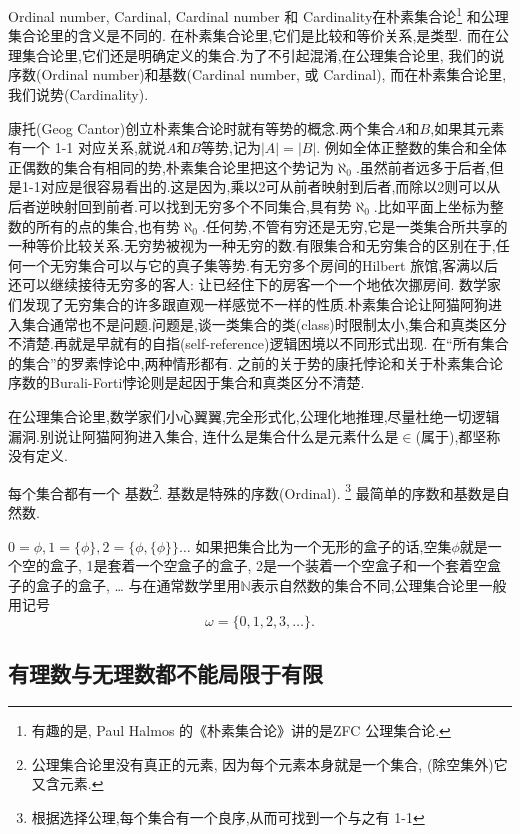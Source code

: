 \documentclass[main.tex]{subfiles}
\begin{document}
Ordinal number, Cardinal, Cardinal number 和 Cardinality在朴素集合论\footnote{有趣的是, Paul Halmos 的《朴素集合论》\cite{HalmosP}讲的是ZFC 公理集合论.}
和公理集合论里的含义是不同的. 
在朴素集合论里,它们是比较和等价关系,是类型.
而在公理集合论里,它们还是明确定义的集合.为了不引起混淆,在公理集合论里,
我们的说序数(Ordinal number)和基数(Cardinal number, 或 Cardinal),
而在朴素集合论里,我们说势(Cardinality).

康托(Geog Cantor)创立朴素集合论时就有等势的概念.两个集合$A$和$B$,如果其元素有一个 1-1 对应关系,就说$A$和$B$等势,记为$|A|=|B|$.
例如全体正整数的集合和全体正偶数的集合有相同的势,朴素集合论里把这个势记为$\aleph_0$.虽然前者远多于后者,但是1-1对应是很容易看出的.这是因为,乘以2可从前者映射到后者,而除以2则可以从后者逆映射回到前者.可以找到无穷多个不同集合,具有势$\aleph_0$.比如平面上坐标为整数的所有的点的集合,也有势$\aleph_0$.任何势,不管有穷还是无穷,它是一类集合所共享的一种等价比较关系.无穷势被视为一种无穷的数.有限集合和无穷集合的区别在于,任何一个无穷集合可以与它的真子集等势.有无穷多个房间的Hilbert 旅馆,客满以后还可以继续接待无穷多的客人: 让已经住下的房客一个一个地依次挪房间.
数学家们发现了无穷集合的许多跟直观一样感觉不一样的性质.朴素集合论让阿猫阿狗进入集合通常也不是问题.问题是,谈一类集合的类(class)时限制太小,集合和真类区分不清楚.再就是早就有的自指(self-reference)逻辑困境以不同形式出现.
在“所有集合的集合”的罗素悖论中,两种情形都有.
之前的关于势的康托悖论和关于朴素集合论序数的Burali-Forti悖论则是起因于集合和真类区分不清楚.

在公理集合论里,数学家们小心翼翼,完全形式化,公理化地推理,尽量杜绝一切逻辑漏洞.别说让阿猫阿狗进入集合, 连什么是集合什么是元素什么是$\in$(属于),都坚称没有定义.

每个集合都有一个
基数\footnote{公理集合论里没有真正的元素,
	因为每个元素本身就是一个集合, (除空集外)它又含元素.}. 
基数是特殊的序数(Ordinal).
\footnote{根据选择公理,每个集合有一个良序,从而可找到一个与之有 1-1 }
最简单的序数和基数是自然数.

$0 = \phi, 1 = \{\phi\}, 2 = \{\phi, \{\phi\}\}\dots$
如果把集合比为一个无形的盒子的话,空集$\phi$就是一个空的盒子, 1是套着一个空盒子的盒子,
2是一个装着一个空盒子和一个套着空盒子的盒子的盒子, \dots
与在通常数学里用$\mathbb{N}$表示自然数的集合不同,公理集合论里一般用记号
$$\omega = \{0, 1, 2, 3, \dots\}.$$


\subsection{有理数与无理数都不能局限于有限}
\end{document}
